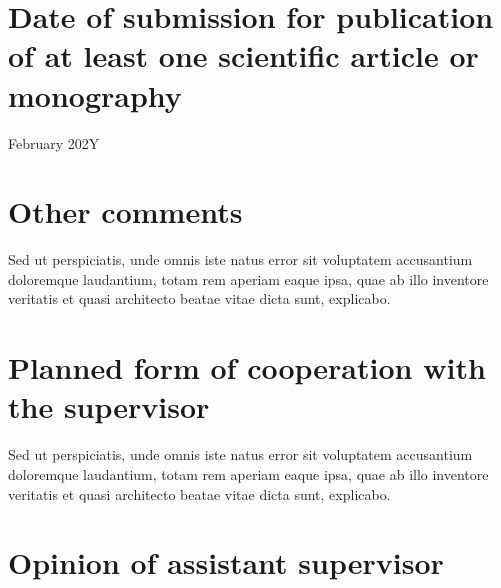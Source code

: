 \section{Date of submission for publication of at least one scientific article or monography}


\begin{center}
    \large February 202Y
\end{center}

\section{Other comments}


Sed ut perspiciatis, unde omnis iste natus error sit voluptatem accusantium doloremque laudantium, totam rem aperiam eaque ipsa, quae ab illo inventore veritatis et quasi architecto beatae vitae dicta sunt, explicabo.


\section{Planned form of cooperation with the supervisor}


Sed ut perspiciatis, unde omnis iste natus error sit voluptatem accusantium doloremque laudantium, totam rem aperiam eaque ipsa, quae ab illo inventore veritatis et quasi architecto beatae vitae dicta sunt, explicabo.


\section{Opinion of assistant supervisor}


